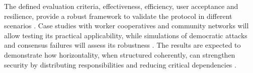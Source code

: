 The defined evaluation criteria, effectiveness, efficiency, user acceptance and
resilience, provide a robust framework to validate the protocol in different
scenarios \cite{RiskCentricThreatModeling}. Case studies with worker
cooperatives and community networks will allow testing its practical
applicability, while simulations of democratic attacks and consensus failures
will assess its robustness \cite{EverydayRevolutions}. The results are expected
to demonstrate how horizontality, when structured coherently, can strengthen
security by distributing responsibilities and reducing critical dependencies
\cite{Colbac, EverydayRevolutions}.
